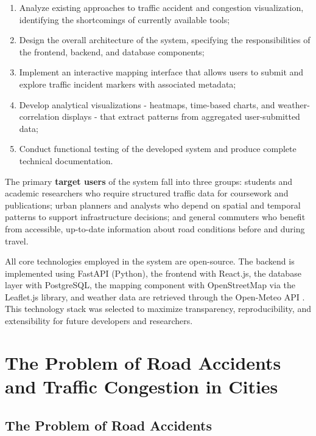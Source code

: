 \documentclass[12pt,a4paper]{report}
\begin{document}
\begin{enumerate}[leftmargin=2.5cm, label=\arabic*.]
  \item Analyze existing approaches to traffic accident and congestion
    visualization, identifying the shortcomings of currently available
    tools;
  \item Design the overall architecture of the system, specifying the
    responsibilities of the frontend, backend, and database components;
  \item Implement an interactive mapping interface that allows users to
    submit and explore traffic incident markers with associated metadata;
  \item Develop analytical visualizations - heatmaps, time-based
    charts, and weather-correlation displays - that extract patterns
    from aggregated user-submitted data;
  \item Conduct functional testing of the developed system and produce
    complete technical documentation.
\end{enumerate}

The primary \textbf{target users} of the system fall into three groups:
students and academic researchers who require structured traffic data
for coursework and publications; urban planners and analysts who depend
on spatial and temporal patterns to support infrastructure decisions;
and general commuters who benefit from accessible, up-to-date
information about road conditions before and during travel.

All core technologies employed in the system are open-source. The
backend is implemented using FastAPI (Python), the frontend with
React.js, the database layer with PostgreSQL, the mapping component
with OpenStreetMap via the Leaflet.js library, and weather data are
retrieved through the Open-Meteo API \cite{fastapi2024, react2024,
osm2024, leaflet2024, openmeteo2023}. This technology stack was
selected to maximize transparency, reproducibility, and extensibility
for future developers and researchers.

\section{The Problem of Road Accidents and Traffic Congestion in Cities}

\subsection{The Problem of Road Accidents}
\end{document}

